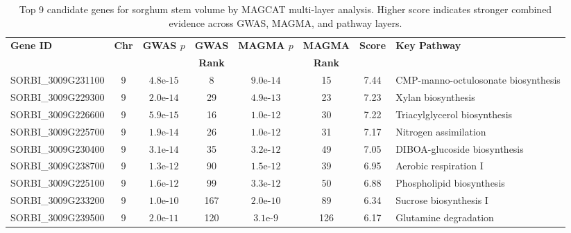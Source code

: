 \begin{table}[htbp]
\centering
\caption{Top 9 candidate genes for sorghum stem volume by MAGCAT multi-layer analysis. Higher score indicates stronger combined evidence across GWAS, MAGMA, and pathway layers.}
\label{tab:top9_compact}
\begin{tabular}{lcccccc>{\raggedright\arraybackslash}p{3.5cm}}
\toprule
\textbf{Gene ID} & \textbf{Chr} & \textbf{GWAS $p$} & \textbf{GWAS} & \textbf{MAGMA $p$} & \textbf{MAGMA} & \textbf{Score} & \textbf{Key Pathway} \\
 & & & \textbf{Rank} & & \textbf{Rank} & & \\
\midrule
SORBI\_3009G231100 & 9 & $4.8\text{e-}15$ & 8 & $9.0\text{e-}14$ & 15 & 7.44 & CMP-manno-octulosonate biosynthesis \\
SORBI\_3009G229300 & 9 & $2.0\text{e-}14$ & 29 & $4.9\text{e-}13$ & 23 & 7.23 & Xylan biosynthesis \\
SORBI\_3009G226600 & 9 & $5.9\text{e-}15$ & 16 & $1.0\text{e-}12$ & 30 & 7.22 & Triacylglycerol biosynthesis \\
SORBI\_3009G225700 & 9 & $1.9\text{e-}14$ & 26 & $1.0\text{e-}12$ & 31 & 7.17 & Nitrogen assimilation \\
SORBI\_3009G230400 & 9 & $3.1\text{e-}14$ & 35 & $3.2\text{e-}12$ & 49 & 7.05 & DIBOA-glucoside biosynthesis \\
SORBI\_3009G238700 & 9 & $1.3\text{e-}12$ & 90 & $1.5\text{e-}12$ & 39 & 6.95 & Aerobic respiration I \\
SORBI\_3009G225100 & 9 & $1.6\text{e-}12$ & 99 & $3.3\text{e-}12$ & 50 & 6.88 & Phospholipid biosynthesis \\
SORBI\_3009G233200 & 9 & $1.0\text{e-}10$ & 167 & $2.0\text{e-}10$ & 89 & 6.34 & Sucrose biosynthesis I \\
SORBI\_3009G239500 & 9 & $2.0\text{e-}11$ & 120 & $3.1\text{e-}9$ & 126 & 6.17 & Glutamine degradation \\
\bottomrule
\end{tabular}
\end{table}
